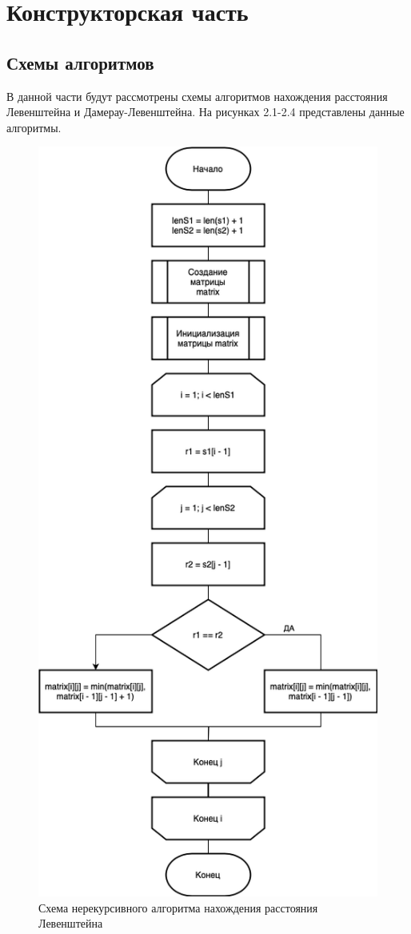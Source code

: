 \chapter{Конструкторская часть}

\section{Схемы алгоритмов}

В данной части будут рассмотрены схемы алгоритмов нахождения расстояния Левенштейна и Дамерау-Левенштейна.
На рисунках 2.1-2.4 представлены данные алгоритмы.

\begin{figure}[h]
	\centering
	\includegraphics[width=0.5\linewidth]{img/L.jpg}
	\caption{Схема нерекурсивного алгоритма нахождения расстояния Левенштейна}
	\label{fig:mpr}
\end{figure}

\clearpage


